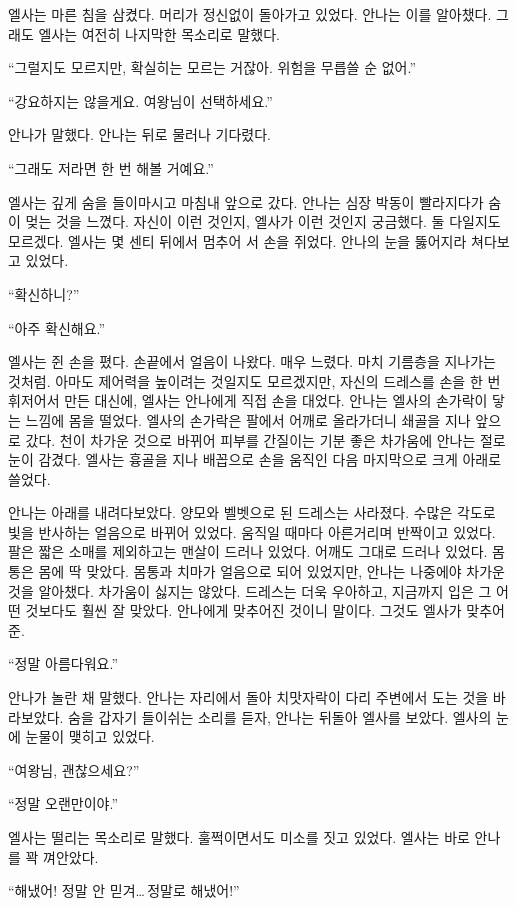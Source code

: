 엘사는 마른 침을 삼켰다. 머리가 정신없이 돌아가고 있었다. 안나는 이를 알아챘다. 그래도 엘사는 여전히 나지막한 목소리로 말했다.

``그럴지도 모르지만, 확실히는 모르는 거잖아. 위험을 무릅쓸 순 없어.''

``강요하지는 않을게요. 여왕님이 선택하세요.''

안나가 말했다. 안나는 뒤로 물러나 기다렸다.

``그래도 저라면 한 번 해볼 거예요.''

엘사는 깊게 숨을 들이마시고 마침내 앞으로 갔다. 안나는 심장 박동이 빨라지다가 숨이 멎는 것을 느꼈다. 자신이 이런 것인지, 엘사가 이런 것인지 궁금했다. 둘 다일지도 모르겠다. 엘사는 몇 센티 뒤에서 멈추어 서 손을 쥐었다. 안나의 눈을 뚫어지라 쳐다보고 있었다.

``확신하니?''

``아주 확신해요.''

엘사는 쥔 손을 폈다. 손끝에서 얼음이 나왔다. 매우 느렸다. 마치 기름층을 지나가는 것처럼. 아마도 제어력을 높이려는 것일지도 모르겠지만, 자신의 드레스를 손을 한 번 휘저어서 만든 대신에, 엘사는 안나에게 직접 손을 대었다. 안나는 엘사의 손가락이 닿는 느낌에 몸을 떨었다. 엘사의 손가락은 팔에서 어깨로 올라가더니 쇄골을 지나 앞으로 갔다. 천이 차가운 것으로 바뀌어 피부를 간질이는 기분 좋은 차가움에 안나는 절로 눈이 감겼다. 엘사는 흉골을 지나 배꼽으로 손을 움직인 다음 마지막으로 크게 아래로 쓸었다.

안나는 아래를 내려다보았다. 양모와 벨벳으로 된 드레스는 사라졌다. 수많은 각도로 빛을 반사하는 얼음으로 바뀌어 있었다. 움직일 때마다 아른거리며 반짝이고 있었다. 팔은 짧은 소매를 제외하고는 맨살이 드러나 있었다. 어깨도 그대로 드러나 있었다. 몸통은 몸에 딱 맞았다. 몸통과 치마가 얼음으로 되어 있었지만, 안나는 나중에야 차가운 것을 알아챘다. 차가움이 싫지는 않았다. 드레스는 더욱 우아하고, 지금까지 입은 그 어떤 것보다도 훨씬 잘 맞았다. 안나에게 맞추어진 것이니 말이다. 그것도 엘사가 맞추어준.

``정말 아름다워요.''

안나가 놀란 채 말했다. 안나는 자리에서 돌아 치맛자락이 다리 주변에서 도는 것을 바라보았다. 숨을 갑자기 들이쉬는 소리를 듣자, 안나는 뒤돌아 엘사를 보았다. 엘사의 눈에 눈물이 맺히고 있었다.

``여왕님, 괜찮으세요?''

``정말 오랜만이야.''

엘사는 떨리는 목소리로 말했다. 훌쩍이면서도 미소를 짓고 있었다. 엘사는 바로 안나를 꽉 껴안았다.

``해냈어! 정말 안 믿겨\ldots\,정말로 해냈어!''

